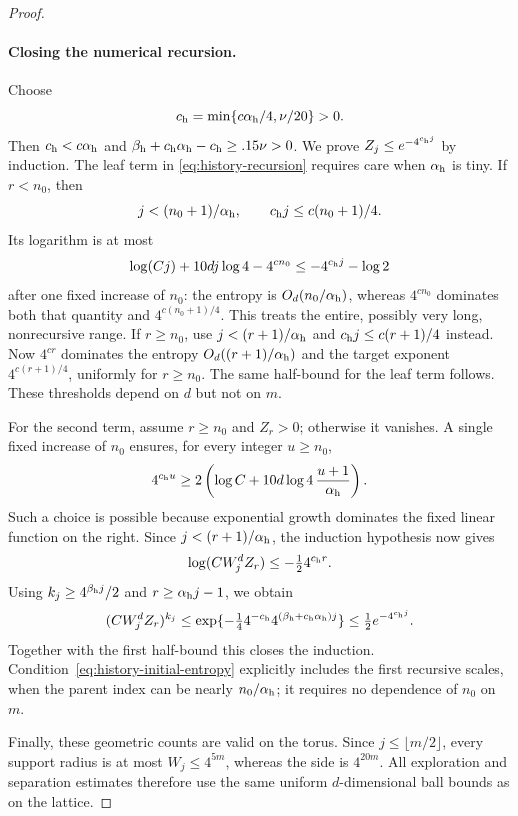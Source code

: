 \begin{proof}
\paragraph{Closing the numerical recursion.}
Choose
\begin{equation}
 c_{\rm h}=\min\{c\alpha_{\rm h}/4,\nu/20\}>0.
 \label{eq:history-exponent}
\end{equation}
Then $c_{\rm h}<c\alpha_{\rm h}$ and
$\beta_{\rm h}+c_{\rm h}\alpha_{\rm h}-c_{\rm h}\ge.15\nu>0$.
We prove $Z_j\le e^{-4^{c_{\rm h}j}}$ by induction. The leaf term in
\eqref{eq:history-recursion} requires care when $\alpha_{\rm h}$ is tiny.
If $r<n_0$, then
\[
 j<(n_0+1)/\alpha_{\rm h},\qquad
 c_{\rm h}j\le c(n_0+1)/4.
\]
Its logarithm is at most
\[
 \log(Cj)+10dj\log4-4^{cn_0}
 \le -4^{c_{\rm h}j}-\log2
\]
after one fixed increase of $n_0$: the entropy is
$O_d(n_0/\alpha_{\rm h})$, whereas $4^{cn_0}$ dominates both that
quantity and $4^{c(n_0+1)/4}$. This treats the entire, possibly very
long, nonrecursive range. If $r\ge n_0$, use
$j<(r+1)/\alpha_{\rm h}$ and
$c_{\rm h}j\le c(r+1)/4$ instead. Now $4^{cr}$ dominates the
entropy $O_d((r+1)/\alpha_{\rm h})$ and the target exponent
$4^{c(r+1)/4}$, uniformly for $r\ge n_0$. The same half-bound for
the leaf term follows. These thresholds depend on $d$ but not on $m$.

For the second term, assume $r\ge n_0$ and $Z_r>0$; otherwise it
vanishes.  A single fixed increase of $n_0$
ensures, for every integer $u\ge n_0$,
\begin{equation}
 4^{c_{\rm h}u}\ge
 2\left(\log C+10d\log4\,\frac{u+1}{\alpha_{\rm h}}\right).
 \label{eq:history-initial-entropy}
\end{equation}
Such a choice is possible because exponential growth dominates the fixed
linear function on the right.  Since $j<(r+1)/\alpha_{\rm h}$, the induction
hypothesis now gives
\[
 \log(CW_j^d Z_r)\le-\tfrac12 4^{c_{\rm h}r}.
\]
Using $k_j\ge4^{\beta_{\rm h} j}/2$ and $r\ge\alpha_{\rm h} j-1$, we obtain
\[
 (CW_j^d Z_r)^{k_j}
 \le\exp\{-\tfrac14 4^{-c_{\rm h}}4^{(\beta_{\rm h}+c_{\rm h}\alpha_{\rm h})j}\}
 \le\tfrac12 e^{-4^{c_{\rm h}j}}.
\]
Together with the first half-bound this closes the induction.
Condition~\eqref{eq:history-initial-entropy} explicitly includes the first
recursive scales, when the parent index can be nearly $n_0/\alpha_{\rm h}$;
it requires no dependence of $n_0$ on $m$.

Finally, these geometric counts are valid on the torus.  Since
$j\le\lfloor m/2\rfloor$, every support radius is at most
$W_j\le4^{5m}$, whereas the side is $4^{20m}$.  All exploration and
separation estimates therefore use the same uniform $d$-dimensional
ball bounds as on the lattice.
\end{proof}

